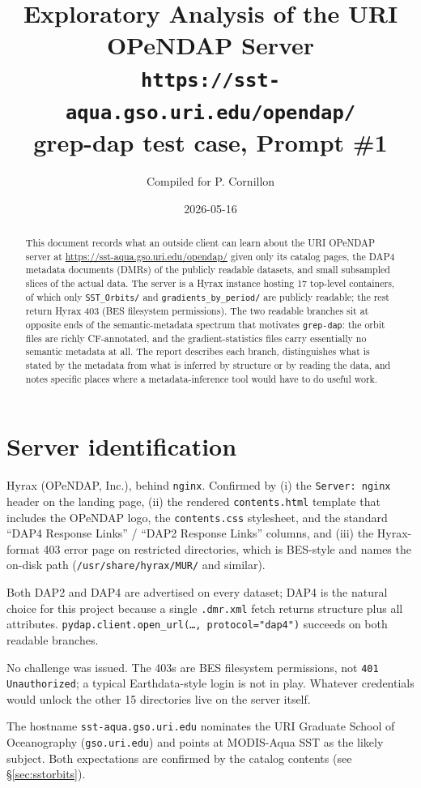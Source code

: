 \documentclass[11pt]{article}
\title{Exploratory Analysis of the URI OPeNDAP Server\\
       \large \texttt{https://sst-aqua.gso.uri.edu/opendap/}\\
       \large grep-dap test case, Prompt \#1}
\author{Compiled for P. Cornillon}
\date{2026-05-16}
\begin{document}
\maketitle

\begin{abstract}
This document records what an outside client can learn about the URI
OPeNDAP server at
\url{https://sst-aqua.gso.uri.edu/opendap/} given only its
catalog pages, the DAP4 metadata documents (DMRs) of the publicly
readable datasets, and small subsampled slices of the actual data.
The server is a Hyrax instance hosting 17 top-level containers, of
which only \texttt{SST\_Orbits/} and \texttt{gradients\_by\_period/}
are publicly readable; the rest return Hyrax 403 (BES filesystem
permissions). The two readable branches sit at opposite ends of the
semantic-metadata spectrum that motivates \texttt{grep-dap}: the
orbit files are richly CF-annotated, and the gradient-statistics
files carry essentially no semantic metadata at all. The report
describes each branch, distinguishes what is stated by the metadata
from what is inferred by structure or by reading the data, and notes
specific places where a metadata-inference tool would have to do
useful work.
\end{abstract}

\tableofcontents

\section{Server identification}

\begin{description}[leftmargin=2em,style=nextline,topsep=2pt]
  \item[Software.] Hyrax (OPeNDAP, Inc.), behind \texttt{nginx}.
    Confirmed by (i) the \texttt{Server: nginx} header on the
    landing page, (ii) the rendered \texttt{contents.html}
    template that includes the OPeNDAP logo, the
    \texttt{contents.css} stylesheet, and the standard ``DAP4
    Response Links'' / ``DAP2 Response Links'' columns, and
    (iii) the Hyrax-format 403 error page on restricted
    directories, which is BES-style and names the on-disk path
    (\texttt{/usr/share/hyrax/MUR/} and similar).
  \item[Protocol.] Both DAP2 and DAP4 are advertised on every
    dataset; DAP4 is the natural choice for this project because
    a single \texttt{.dmr.xml} fetch returns structure plus all
    attributes. \texttt{pydap.client.open\_url(\dots,
    protocol="dap4")} succeeds on both readable branches.
  \item[Authentication.] No challenge was issued. The 403s are
    BES filesystem permissions, not \texttt{401 Unauthorized}; a
    typical Earthdata-style login is not in play. Whatever
    credentials would unlock the other 15 directories live on the
    server itself.
  \item[Hostname signal.] The hostname \texttt{sst-aqua.gso.uri.edu}
    nominates the URI Graduate School of Oceanography
    (\texttt{gso.uri.edu}) and points at MODIS-Aqua SST as the
    likely subject. Both expectations are confirmed by the
    catalog contents (see \S\ref{sec:sstorbits}).
\end{description}
\end{document}
